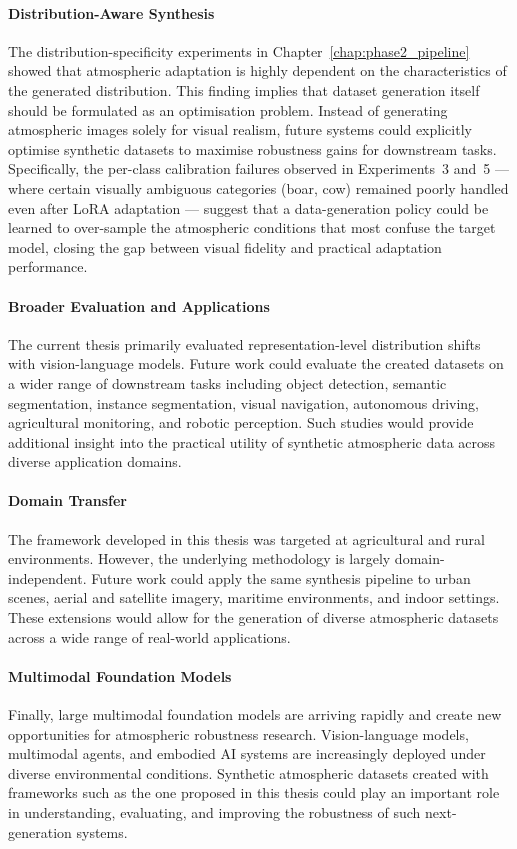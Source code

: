 \paragraph{Distribution-Aware Synthesis}
The distribution-specificity experiments in Chapter~\ref{chap:phase2_pipeline} showed that atmospheric adaptation is highly dependent on the characteristics of the generated distribution. This finding implies that dataset generation itself should be formulated as an optimisation problem. Instead of generating atmospheric images solely for visual realism, future systems could explicitly optimise synthetic datasets to maximise robustness gains for downstream tasks. Specifically, the per-class calibration failures observed in Experiments~3 and~5 --- where certain visually ambiguous categories (boar, cow) remained poorly handled even after LoRA adaptation --- suggest that a data-generation policy could be learned to over-sample the atmospheric conditions that most confuse the target model, closing the gap between visual fidelity and practical adaptation performance.

\paragraph{Broader Evaluation and Applications}
The current thesis primarily evaluated representation-level distribution shifts with vision-language models. Future work could evaluate the created datasets on a wider range of downstream tasks including object detection, semantic segmentation, instance segmentation, visual navigation, autonomous driving, agricultural monitoring, and robotic perception. Such studies would provide additional insight into the practical utility of synthetic atmospheric data across diverse application domains.

\paragraph{Domain Transfer}
The framework developed in this thesis was targeted at agricultural and rural environments. However, the underlying methodology is largely domain-independent. Future work could apply the same synthesis pipeline to urban scenes, aerial and satellite imagery, maritime environments, and indoor settings. These extensions would allow for the generation of diverse atmospheric datasets across a wide range of real-world applications.

\paragraph{Multimodal Foundation Models}
Finally, large multimodal foundation models are arriving rapidly and create new opportunities for atmospheric robustness research. Vision-language models, multimodal agents, and embodied AI systems are increasingly deployed under diverse environmental conditions. Synthetic atmospheric datasets created with frameworks such as the one proposed in this thesis could play an important role in understanding, evaluating, and improving the robustness of such next-generation systems.

